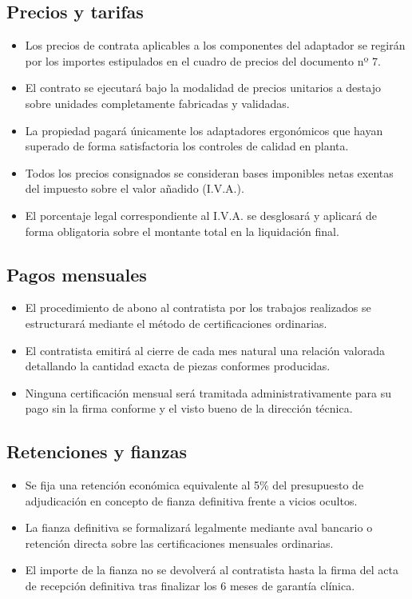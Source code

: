 \documentclass[11pt,a4paper]{article}
\begin{document}
\subsection{Precios y tarifas}
\begin{itemize}
    \item Los precios de contrata aplicables a los componentes del adaptador se regirán por los importes estipulados en el cuadro de precios del documento nº 7.
    \item El contrato se ejecutará bajo la modalidad de precios unitarios a destajo sobre unidades completamente fabricadas y validadas.
    \item La propiedad pagará únicamente los adaptadores ergonómicos que hayan superado de forma satisfactoria los controles de calidad en planta.
    \item Todos los precios consignados se consideran bases imponibles netas exentas del impuesto sobre el valor añadido (I.V.A.).
    \item El porcentaje legal correspondiente al I.V.A. se desglosará y aplicará de forma obligatoria sobre el montante total en la liquidación final.
\end{itemize}

\subsection{Pagos mensuales}
\begin{itemize}
    \item El procedimiento de abono al contratista por los trabajos realizados se estructurará mediante el método de certificaciones ordinarias.
    \item El contratista emitirá al cierre de cada mes natural una relación valorada detallando la cantidad exacta de piezas conformes producidas.
    \item Ninguna certificación mensual será tramitada administrativamente para su pago sin la firma conforme y el visto bueno de la dirección técnica.
\end{itemize}

\subsection{Retenciones y fianzas}
\begin{itemize}
    \item Se fija una retención económica equivalente al 5\% del presupuesto de adjudicación en concepto de fianza definitiva frente a vicios ocultos.
    \item La fianza definitiva se formalizará legalmente mediante aval bancario o retención directa sobre las certificaciones mensuales ordinarias.
    \item El importe de la fianza no se devolverá al contratista hasta la firma del acta de recepción definitiva tras finalizar los 6 meses de garantía clínica.
\end{itemize}
\end{document}

